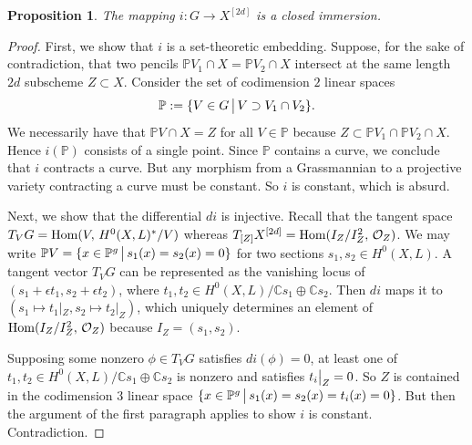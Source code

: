 \documentclass{amsart}
\newtheorem{proposition}[theorem]{Proposition}
\theoremstyle{definition}
\newcommand\bP{\mathbb P}
\newcommand{\C}{\mathbb{C}}
\begin{document}
\begin{proposition}\label{closed-immersion} The mapping $i\colon G\to X^{[2d]}$ is a closed immersion. \end{proposition}

\begin{proof} First, we show that $i$ is a set-theoretic embedding. Suppose,
for the sake of contradiction, that two pencils
$\mathbb PV_1\cap X = \mathbb PV_2\cap X$ intersect at the same length $2d$ subscheme $Z\subset X$.
Consider the set of codimension
$2$ linear spaces $$\mathbb{P}:=\{V\in G\,\big{|}\,V\supset V_1\cap V_2\}.$$ We necessarily have 
that $\bP V\cap X=Z$ for all $V\in \mathbb{P}$ because $Z\subset\bP V_1\cap\bP V_2\cap X$.
Hence $i(\mathbb{P})$ consists
of a single point. Since $\mathbb{P}$ contains a curve, we conclude that $i$ contracts a curve. But
any morphism from a Grassmannian to a projective variety contracting a curve must be constant.
So $i$ is constant, which is absurd.

Next, we show that the differential $di$ is injective. Recall that the tangent space
$T_VG={\rm Hom}(V,\,H^0(X,L)^*/V)$ whereas
$T_{[Z]}X^{[2d]}={\rm Hom}(I_Z /I_Z^2,\,\mathcal{O}_Z)$. We may write
$\mathbb PV=\{x\in \mathbb{P}^g\,\big{|}\, s_1(x)=s_2(x)=0\}$
for two sections $s_1,s_2\in H^0(X,L)$. 
A tangent vector $T_VG$ can be represented as the
vanishing locus of $(s_1+\epsilon t_1, s_2+\epsilon t_2)$,
where $t_1,t_2\in H^0(X,L)/\C s_1\oplus \C s_2$. 
Then $di$ maps it to $(s_1\mapsto t_1|_Z, s_2\mapsto t_2|_Z)$,
which uniquely determines an element of
${\rm Hom}(I_Z /I_Z^2,\,\mathcal{O}_Z)$ because
$I_Z=( s_1,s_2)$.
  
Supposing some nonzero $\phi\in T_VG$ satisfies $di(\phi)=0$,
at least one of $t_1, t_2\in H^0(X,L)/\C s_1\oplus \C s_2$ is
nonzero and satisfies $t_i \big{|}_Z=0$.
So $Z$ is contained in the codimension $3$
linear space $\{x\in \mathbb{P}^g\,\big{|}\,s_1(x)=s_2(x)=t_i(x)=0\}$.
But then the argument of the first paragraph applies to show
$i$ is constant. Contradiction.
 \end{proof}
 
\end{document}
